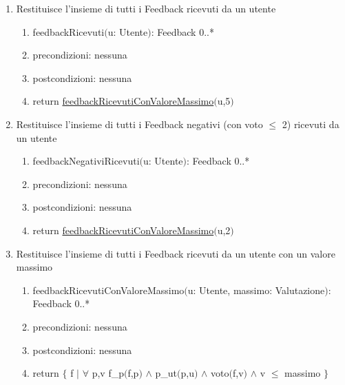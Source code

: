 \documentclass{article}
\begin{document}
\begin{enumerate}
    \newpage
    \item\label{sec:feedbackRicevuti} Restituisce l'insieme di tutti i Feedback ricevuti da un utente
    \begin{enumerate}
        \item feedbackRicevuti$($u: Utente$)$: Feedback 0..*
        \item precondizioni: nessuna
        \item postcondizioni: nessuna
        \item return \hyperref[sec:feedbackRicevutiConValoreMassimo]{feedbackRicevutiConValoreMassimo}$($u,5$)$
    \end{enumerate}
    \newpage
    \item\label{sec:feedbackNegativiRicevuti} Restituisce l'insieme di tutti i Feedback negativi (con voto $\leq$ 2) ricevuti da un utente
    \begin{enumerate}
        \item feedbackNegativiRicevuti$($u: Utente$)$: Feedback 0..*
        \item precondizioni: nessuna
        \item postcondizioni: nessuna
        \item return \hyperref[sec:feedbackRicevutiConValoreMassimo]{feedbackRicevutiConValoreMassimo}$($u,2$)$
    \end{enumerate}
    \newpage
    \item\label{sec:feedbackRicevutiConValoreMassimo} Restituisce l'insieme di tutti i Feedback ricevuti da un utente con un valore massimo
    \begin{enumerate}
        \item feedbackRicevutiConValoreMassimo$($u: Utente, massimo: Valutazione$)$: Feedback 0..*
        \item precondizioni: nessuna
        \item postcondizioni: nessuna
        \item return $\{$ f $|$ $\forall$ p,v f\_p$($f,p$)$ $\land$ p\_ut$($p,u$)$ $\land$ voto$($f,v$)$ $\land$ v $\leq$ massimo $\}$
    \end{enumerate}
\end{enumerate}
\end{document}
